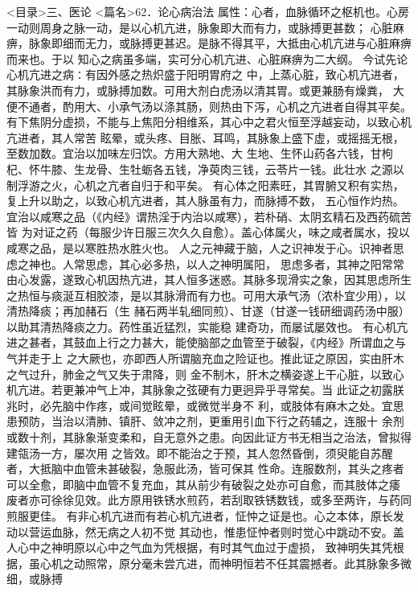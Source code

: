\documentclass[a4paper,12pt,UTF8,twoside]{ctexbook}
\begin{document}
<目录>三、医论
<篇名>62．论心病治法
属性：心者，血脉循环之枢机也。心房一动则周身之脉一动，是以心机亢进，脉象即大而有力，或脉搏更甚数； 
心脏麻痹，脉象即细而无力，或脉搏更甚迟。是脉不得其平，大抵由心机亢进与心脏麻痹而来也。于以 
知心之病虽多端，实可分心机亢进、心脏麻痹为二大纲。 
今试先论心机亢进之病∶有因外感之热炽盛于阳明胃府之 
中，上蒸心脏，致心机亢进者，其脉象洪而有力，或脉搏加数。可用大剂白虎汤以清其胃。或更兼肠有燥粪， 
大便不通者，酌用大、小承气汤以涤其肠，则热由下泻，心机之亢进者自得其平矣。 
有下焦阴分虚损，不能与上焦阳分相维系，其心中之君火恒至浮越妄动，以致心机亢进者，其人常苦 
眩晕，或头疼、目胀、耳鸣，其脉象上盛下虚，或摇摇无根，至数加数。宜治以加味左归饮。方用大熟地、大 
生地、生怀山药各六钱，甘枸杞、怀牛膝、生龙骨、生牡蛎各五钱，净萸肉三钱，云苓片一钱。此壮水 
之源以制浮游之火，心机之亢者自归于和平矣。 
有心体之阳素旺，其胃腑又积有实热，复上升以助之，以致心机亢进者，其人脉虽有力，而脉搏不数， 
五心恒作灼热。宜治以咸寒之品（《内经》谓热淫于内治以咸寒），若朴硝、太阴玄精石及西药硫苦皆 
为对证之药（每服少许日服三次久久自愈）。盖心体属火，味之咸者属水，投以咸寒之品，是以寒胜热水胜火也。 
人之元神藏于脑，人之识神发于心。识神者思虑之神也。人常思虑，其心必多热，以人之神明属阳， 
思虑多者，其神之阳常常由心发露，遂致心机因热亢进，其人恒多迷惑。其脉多现滑实之象，因其思虑所生 
之热恒与痰涎互相胶漆，是以其脉滑而有力也。可用大承气汤（浓朴宜少用），以清热降痰；再加赭石（生 
赭石两半轧细同煎）、甘遂（甘遂一钱研细调药汤中服）以助其清热降痰之力。药性虽近猛烈，实能稳 
建奇功，而屡试屡效也。 
有心机亢进之甚者，其鼓血上行之力甚大，能使脑部之血管至于破裂，《内经》所谓血之与气并走于上 
之大厥也，亦即西人所谓脑充血之险证也。推此证之原因，实由肝木之气过升，肺金之气又失于肃降，则 
金不制木，肝木之横姿遂上干心脏，以致心机亢进。若更兼冲气上冲，其脉象之弦硬有力更迥异乎寻常矣。当 
此证之初露朕兆时，必先脑中作疼，或间觉眩晕，或微觉半身不 
利，或肢体有麻木之处。宜思患预防，当治以清肺、镇肝、敛冲之剂，更重用引血下行之药辅之，连服十 
余剂或数十剂，其脉象渐变柔和，自无意外之患。向因此证方书无相当之治法，曾拟得建瓴汤一方，屡次用 
之皆效。即不能治之于预，其人忽然昏倒，须臾能自苏醒者，大抵脑中血管未甚破裂，急服此汤，皆可保其 
性命。连服数剂，其头之疼者可以全愈，即脑中血管不复充血，其从前少有破裂之处亦可自愈，而其肢体之痿 
废者亦可徐徐见效。此方原用铁锈水煎药，若刮取铁锈数钱，或多至两许，与药同煎服更佳。 
有非心机亢进而有若心机亢进者，怔忡之证是也。心之本体，原长发动以营运血脉，然无病之人初不觉 
其动也，惟患怔忡者则时觉心中跳动不安。盖人心中之神明原以心中之气血为凭根据，有时其气血过于虚损， 
致神明失其凭根据，虽心机之动照常，原分毫未尝亢进，而神明恒若不任其震撼者。此其脉象多微细，或脉搏 
\end{document}
